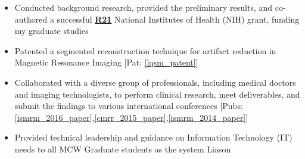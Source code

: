 \begin{minipage}{\textwidth}
	\begin{itemize}
	\item Conducted background research, provided the preliminary results, and co-authored a successful \href{https://grants.nih.gov/grants/funding/r21.htm}{\textbf{R21}} National Institutes of Health (NIH) grant, funding my graduate studies\none
   	\item Patented a segmented reconstruction technique for artifact reduction in Magnetic Resonance Imaging [Pat: \ref{lqsm_patent}]\none
	\item Collaborated with a diverse group of professionals, including medical doctors and imaging technologists, to perform clinical research, meet deliverables, and submit the findings to 
             various international conferences [Pubs: \ref{ismrm_2016_paper},\ref{cmrr_2015_paper},\ref{ismrm_2014_paper}]\none
	\item Provided technical leadership and guidance on Information Technology (IT) needs to all MCW Graduate students as the system Liason\ntwo
	\end{itemize}
\end{minipage}


